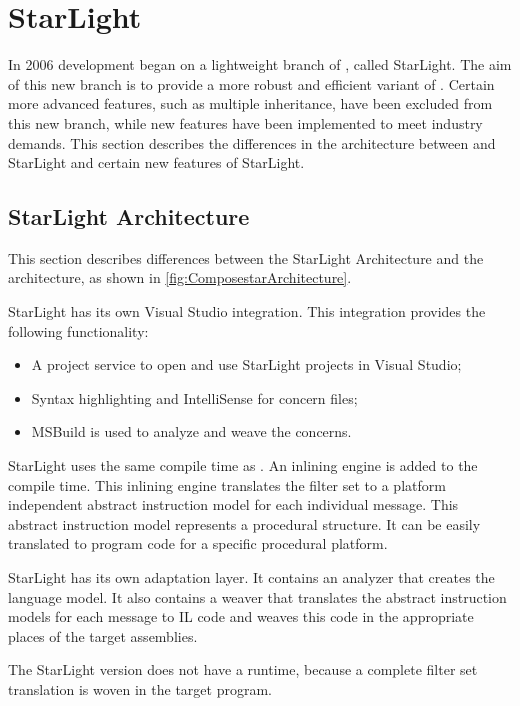 \section{StarLight}
\label{sec:ComposestarStarLight}

In 2006 development began on a lightweight branch of \Compose*[.NET], called StarLight. The aim of this new branch is to provide a more robust and efficient variant of \Compose*. Certain more advanced features, such as multiple inheritance, have been excluded from this new branch, while new features have been implemented to meet industry demands. This section describes the differences in the architecture between \Compose* and StarLight and certain new features of StarLight.

\subsection{StarLight Architecture}
This section describes differences between the StarLight Architecture and the \Compose* architecture, as shown in \autoref{fig:ComposestarArchitecture}.
\begin{description}[style=nextline]
\item[Integrated Development Environment]
StarLight has its own Visual Studio integration. This integration provides the following functionality:
\begin{itemize}[noitemsep]
\item A project service to open and use StarLight projects in Visual Studio;
\item Syntax highlighting and IntelliSense for concern files;
\item MSBuild is used to analyze and weave the concerns. 
\end{itemize}
\item[Compile Time]
StarLight uses the same compile time as \Compose*. An inlining engine is added to the compile time. This inlining engine translates the filter set to a platform independent abstract instruction model for each individual message. This abstract instruction model represents a procedural structure. It can be easily translated to program code for a specific procedural platform.
\item[Adaptation]
StarLight has its own adaptation layer. It contains an analyzer that creates the language model. It also contains a weaver that translates the abstract instruction models for each message to IL code and weaves this code in the appropriate places of the target assemblies.
\item[Runtime]
The StarLight version does not have a runtime, because a complete filter set translation is woven in the target program.
\end{description}

